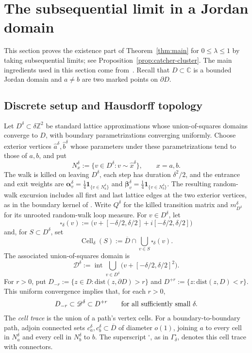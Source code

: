 \documentclass[11pt]{article}
\numberwithin{equation}{section}
\newcommand{\C}{\mathbb{C}}
\newcommand{\Z}{\mathbb{Z}}
\newcommand{\1}{\mathbf{1}}
\newcommand{\dist}{\mathrm{dist}}
\newcommand\ol[1]{\overline{#1}}
\newcommand{\one}{\mathbf 1}
\newcommand{\balpha}{\boldsymbol{\alpha}}
\newcommand{\bbeta}{\boldsymbol{\beta}}
\newcommand{\Cell}{\operatorname{Cell}}
\begin{document}
\section{The subsequential limit in a Jordan domain}
\label{sec:continuum}

This section proves the existence part of Theorem~\ref{thm:main} for
\(0\leq\lambda\leq1\) by taking subsequential limits; see Proposition~\ref{prop:catcher-cluster}. The main ingredients used in this section come from~\cite{KozdronLawler2005,LawlerTrujillo2007,LawlerLimic2010}. Recall that \(D\subset\C\) is a bounded Jordan
domain and \(a\ne b\) are two marked points on $\partial D$.

\subsection{Discrete setup and Hausdorff topology}
\label{subsec:continuum-embedding}
Let \(D^\delta\subset\delta\Z^2\) be standard lattice approximations whose
union-of-squares domains converge to \(D\), with boundary parametrizations
converging uniformly.  Choose exterior vertices
\(\widehat a^\delta,\widehat b^\delta\) whose parameters under these
parametrizations tend to those of \(a,b\), and put
\[
 N_x^\delta:=\{v\in D^\delta:v\sim\widehat x^\delta\},\qquad x=a,b.
\]
The walk is killed on leaving \(D^\delta\), each step has duration
\(\delta^2/2\), and the entrance and exit weights are
\(\balpha_v^\delta=\frac14\one_{\{v\in N_a^\delta\}}\) and
\(\bbeta_v^\delta=\frac14\one_{\{v\in N_b^\delta\}}\).  The resulting
random-walk excursion includes all first and last lattice edges at
the two exterior vertices, as in the boundary kernel of
\cite{KozdronLawler2005}.  Write \(Q^\delta\) for the
killed transition matrix and \(m_{D^\delta}^\delta\) for its unrooted
random-walk loop measure.  For \(v\in D^\delta\), let
\[
 \square_\delta(v)
 :=\bigl(v+[-\delta/2,\delta/2]
                    +i[-\delta/2,\delta/2]\bigr)
\]
and, for \(S\subset D^\delta\), set
\[
\Cell_\delta(S):=\ol D\cap\bigcup_{v\in S}\square_\delta(v).
\]
The associated union-of-squares domain is
\[
\mathscr D^\delta
 :=\operatorname{int}\!\bigcup_{v\in D^\delta}
   \bigl(v+[-\delta/2,\delta/2]^2\bigr).
\]
For \(r>0\), put $D_{-r}:=\{z\in D:\dist(z,\partial D)>r\}$ and $D^{+r}:=\{z:\dist(z,D)<r\}$.
This uniform convergence implies that, for each
\(r>0\),
\begin{equation}\label{eq:domain-inclusions}
 D_{-r}\subset\mathscr D^\delta\subset D^{+r}
 \qquad\hbox{for all sufficiently small }\delta.
\end{equation}
The \emph{cell trace} is the union of a path's vertex cells.  For a
boundary-to-boundary path, adjoin connected sets \(c_a^\delta,c_b^\delta\subset\ol D\) of diameter \(o(1)\), joining
\(a\) to every cell in \(N_a^\delta\) and every cell in
\(N_b^\delta\) to \(b\).
The superscript \({}^\square\), as in \(\Gamma_\delta^\square\), denotes
this cell trace with connectors.  
\end{document}
